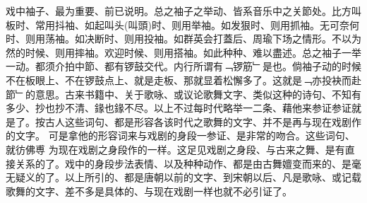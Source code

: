 \documentclass{zhvt-classic}
\begin{document}
戏中袖子、最为重要、前已说明。总之袖子之举动、皆系音乐中之关節处。比方叫板时、常用抖袖、如起叫头(叫頭)时、则用举袖。如发狠时、则用抓袖。无可奈何时、则用荡袖。如决断时、则用投袖。如群英会打蓋后、周瑜下场之情形。不以为然的时候、则用摔袖。欢迎时候、则用搭袖。如此种种、难以盡述。总之袖子一举一动。都须介拍中節、都有锣鼓交代。内行所谓有﹁锣筋﹂是也。倘袖子动的时候不在板眼上、不在锣鼓点上、就是走板、那就显着松懈多了。这就是﹁亦投袂而赴節﹂的意思。古来书籍中、关于歌咏、或议论歌舞文字、类似这种的诗句、不知有多少、抄也抄不清、䤸也䤸不尽。以上不过每时代略举一二条、藉他来参证参证就是了。按古人这些词句、都是形容各该时代之歌舞的文字、并不是再与现在戏剧作的文字。
可是拿他的形容词来与戏剧的身段一参证、是非常的吻合。这些词句、就彷佛尃
为现在戏剧之身段作的一样。这足见戏剧之身段、与古来之舞、是有直接关系的了。戏中的身段步法表情、以及种种动作、都是由古舞嬗变而来的、是毫无疑义的了。以上所引的、都是唐朝以前的文字、到宋朝以后、凡是歌咏、或记载歌舞的文字、差不多是具体的、与现在戏剧一样也就不必引证了。
\end{document}
